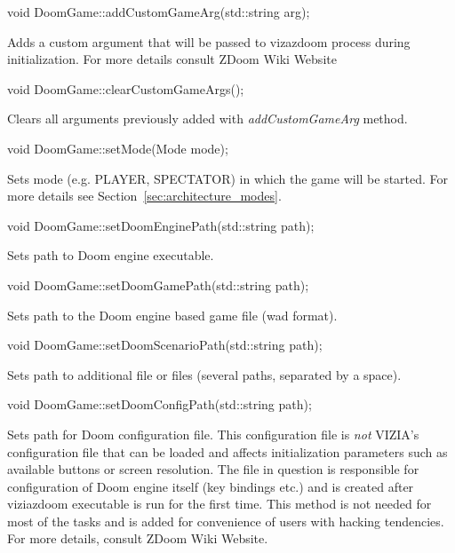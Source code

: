 \vspace{20pt}
\begin{clinee}
void DoomGame::addCustomGameArg(std::string arg);
\end{clinee}
	Adds a custom argument that will be passed to vizazdoom process during initialization. For more details consult ZDoom Wiki Website\cite{zdoom-wiki}


\vspace{20pt}
\begin{clinee}
void DoomGame::clearCustomGameArgs();
\end{clinee}
	Clears all arguments previously added with \emph{addCustomGameArg} method.


\vspace{20pt}
\begin{clinee}
void DoomGame::setMode(Mode mode);
\end{clinee}
	Sets mode (e.g. PLAYER, SPECTATOR) in which the game will be started. For more details see Section~\ref{sec:architecture_modes}.


\vspace{20pt}
\begin{clinee}
void DoomGame::setDoomEnginePath(std::string path);
\end{clinee}

Sets path to Doom engine executable.


\vspace{20pt}
\begin{clinee}
void DoomGame::setDoomGamePath(std::string path);
\end{clinee}

Sets path to the Doom engine based game file (wad format).


\vspace{20pt}
\begin{clinee}
void DoomGame::setDoomScenarioPath(std::string path);
\end{clinee}
	Sets path to additional file or files (several paths, separated by a space).


\vspace{20pt}
\begin{clinee}
void DoomGame::setDoomConfigPath(std::string path);
\end{clinee}
	Sets path for Doom configuration file. This configuration file is \emph{not} VIZIA's configuration file that can be loaded and affects initialization parameters such as available buttons or screen resolution. The file in question is responsible for configuration of Doom engine itself (key bindings etc.) and is created after viziazdoom executable is run for the first time. This method is not needed for most of the tasks and is added for convenience of users with hacking tendencies. For more details, consult ZDoom Wiki Website\cite{zdoom-wiki}.


